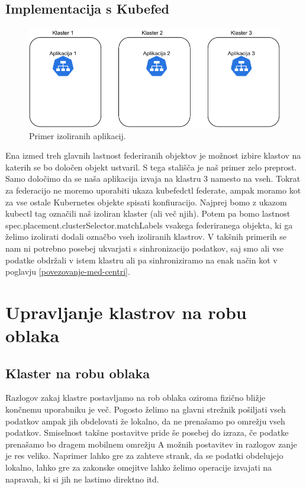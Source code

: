 \documentclass[a4paper, 12pt]{book}
\begin{document}
\section{Implementacija s Kubefed}
\begin{figure}[h]
\begin{center}
  \includegraphics[width=1.0\textwidth]{images/primer-izolirane-aplikacije.pdf}
\end{center}
\caption{Primer izoliranih aplikacij.}
\label{problem-prevelike-latence}
\end{figure}
Ena izmed treh glavnih lastnost federiranih objektov je možnost izbire klastov na katerih se bo določen objekt ustvaril. 
S tega stališča je naš primer zelo preprost.
Samo določimo da se naša aplikacija izvaja na klastru 3 namesto na vseh.
Tokrat za federacijo ne moremo uporabiti ukaza kubefedctl federate, ampak moramo kot za vse ostale Kubernetes objekte spisati konfiuracijo.
Najprej bomo z ukazom kubectl tag označili naš izoliran klaster (ali več njih).
Potem pa bomo lastnost spec.placement.clusterSelector.matchLabels vsakega federiranega objekta, ki ga želimo izolirati dodali označbo vseh izoliranih klastrov.
V takšnih primerih se nam ni potrebno posebej ukvarjati s sinhronizacijo podatkov, saj smo ali vse podatke obdržali v istem klastru ali pa sinhroniziramo na enak način kot v poglavju \ref{povezovanje-med-centri}.
\chapter{Upravljanje klastrov na robu oblaka}
\section{Klaster na robu oblaka}
Razlogov zakaj klastre postavljamo na rob oblaka oziroma fizično bližje končnemu uporabniku je več.
Pogosto želimo na glavni strežnik pošiljati vseh podatkov ampak jih obdelovati že lokalno, da ne prenašamo po omrežju vseh podatkov.
Smiselnost takšne postavitve pride še posebej do izraza, če podatke prenašamo bo dragem mobilnem omrežju
A možnih postavitev in razlogov zanje je res veliko.
Naprimer lahko gre za zahteve strank, da se podatki obdelujejo lokalno, lahko gre za zakonske omejitve lahko želimo operacije izvajati na napravah, ki si jih ne lastimo direktno itd.
\end{document}
